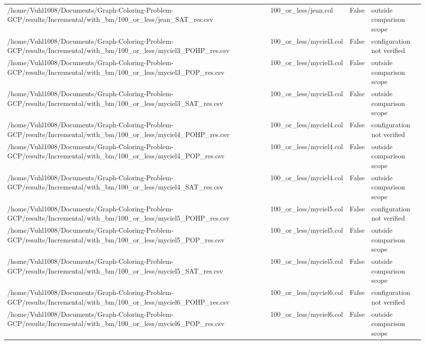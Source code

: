 \begin{table}[htbp]
\begin{tabular}{llll}
/home/Vuhl1008/Documents/Graph-Coloring-Problem-GCP/results/Incremental/with\_bm/100\_or\_less/jean\_SAT\_res.csv & 100\_or\_less/jean.col & False & outside comparison scope \\
/home/Vuhl1008/Documents/Graph-Coloring-Problem-GCP/results/Incremental/with\_bm/100\_or\_less/myciel3\_POHP\_res.csv & 100\_or\_less/myciel3.col & False & configuration not verified \\
/home/Vuhl1008/Documents/Graph-Coloring-Problem-GCP/results/Incremental/with\_bm/100\_or\_less/myciel3\_POP\_res.csv & 100\_or\_less/myciel3.col & False & outside comparison scope \\
/home/Vuhl1008/Documents/Graph-Coloring-Problem-GCP/results/Incremental/with\_bm/100\_or\_less/myciel3\_SAT\_res.csv & 100\_or\_less/myciel3.col & False & outside comparison scope \\
/home/Vuhl1008/Documents/Graph-Coloring-Problem-GCP/results/Incremental/with\_bm/100\_or\_less/myciel4\_POHP\_res.csv & 100\_or\_less/myciel4.col & False & configuration not verified \\
/home/Vuhl1008/Documents/Graph-Coloring-Problem-GCP/results/Incremental/with\_bm/100\_or\_less/myciel4\_POP\_res.csv & 100\_or\_less/myciel4.col & False & outside comparison scope \\
/home/Vuhl1008/Documents/Graph-Coloring-Problem-GCP/results/Incremental/with\_bm/100\_or\_less/myciel4\_SAT\_res.csv & 100\_or\_less/myciel4.col & False & outside comparison scope \\
/home/Vuhl1008/Documents/Graph-Coloring-Problem-GCP/results/Incremental/with\_bm/100\_or\_less/myciel5\_POHP\_res.csv & 100\_or\_less/myciel5.col & False & configuration not verified \\
/home/Vuhl1008/Documents/Graph-Coloring-Problem-GCP/results/Incremental/with\_bm/100\_or\_less/myciel5\_POP\_res.csv & 100\_or\_less/myciel5.col & False & outside comparison scope \\
/home/Vuhl1008/Documents/Graph-Coloring-Problem-GCP/results/Incremental/with\_bm/100\_or\_less/myciel5\_SAT\_res.csv & 100\_or\_less/myciel5.col & False & outside comparison scope \\
/home/Vuhl1008/Documents/Graph-Coloring-Problem-GCP/results/Incremental/with\_bm/100\_or\_less/myciel6\_POHP\_res.csv & 100\_or\_less/myciel6.col & False & configuration not verified \\
/home/Vuhl1008/Documents/Graph-Coloring-Problem-GCP/results/Incremental/with\_bm/100\_or\_less/myciel6\_POP\_res.csv & 100\_or\_less/myciel6.col & False & outside comparison scope \\

\end{tabular}
\end{table}

